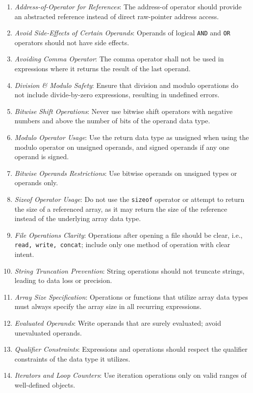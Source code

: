\documentclass[9pt]{IEEEtran} %
\begin{document}
\begin{enumerate}
  \item \textit{Address-of-Operator for References}: The address-of operator should provide an abstracted reference instead of direct raw-pointer address access.
  \item \textit{Avoid Side-Effects of Certain Operands}: Operands of logical \texttt{AND} and \texttt{OR} operators should not have side effects.
  \item \textit{Avoiding Comma Operator}: The comma operator shall not be used in expressions where it returns the result of the last operand.
  \item \textit{Division \& Modulo Safety}: Ensure that division and modulo operations do not include divide-by-zero expressions, resulting in undefined errors.
  \item \textit{Bitwise Shift Operations}: Never use bitwise shift operators with negative numbers and above the number of bits of the operand data type.
  \item \textit{Modulo Operator Usage}: Use the return data type as unsigned when using the modulo operator on unsigned operands, and signed operands if any one operand is signed.
  \item \textit{Bitwise Operands Restrictions}: Use bitwise operands on unsigned types or operands only.
  \item \textit{Sizeof Operator Usage}: Do not use the \texttt{sizeof} operator or attempt to return the size of a referenced array, as it may return the size of the reference instead of the underlying array data type.
  \item \textit{File Operations Clarity}: Operations after opening a file should be clear, i.e., \texttt{read, write, concat}; include only one method of operation with clear intent.
  \item \textit{String Truncation Prevention}: String operations should not truncate strings, leading to data loss or precision.
  \item \textit{Array Size Specification}: Operations or functions that utilize array data types must always specify the array size in all recurring expressions.
  \item \textit{Evaluated Operands}: Write operands that are surely evaluated; avoid unevaluated operands.
  \item \textit{Qualifier Constraints}: Expressions and operations should respect the qualifier constraints of the data type it utilizes.
  \item \textit{Iterators and Loop Counters}: Use iteration operations only on valid ranges of well-defined objects.

\end{enumerate}
\end{document}
